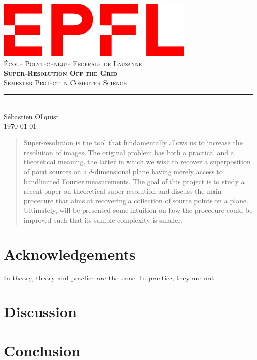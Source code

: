 \documentclass[11pt,titlepage]{report}
\begin{document}
\begin{titlepage}
	\centering
    \includegraphics[width=0.5\linewidth]{images/EPFL.png}\\[0.25cm] 	%
    \textsc{\LARGE École Polytechnique Fédérale de Lausanne}\\ \vspace{\fill}
    \textbf{\textsc{\fontsize{30}{30}\selectfont Super-Resolution Off the Grid}}\\ \vspace{\fill}		
	\textsc{\LARGE Semester Project in Computer Science}\\[0.4cm]
	\rule{\linewidth}{0.2 mm} \\[0.5 cm]
	Sébastien Ollquist \\[2cm] \today
\end{titlepage}
\restoregeometry

\thispagestyle{numberonly}
\begin{abstract}
    Super-resolution is the tool that fundamentally allows us to increase the resolution of images. The original problem has both a practical and a theoretical meaning, the latter in which we wish to recover a superposition of point sources on a $d$-dimensional plane having merely access to bandlimited Fourier measurements. The goal of this project is to study a recent paper on theoretical super-resolution and discuss the main procedure that aims at recovering a collection of source points on a plane. Ultimately, will be presented some intuition on how the procedure could be improved such that its sample complexity is smaller.
\end{abstract}
\chapter*{Acknowledgements}
\begin{fquote}
    In theory, theory and practice are the same. In practice, they are not.
\end{fquote} 
\newpage

\tableofcontents






\chapter{Discussion}

\chapter{Conclusion}

\printbibliography

\appendix


\clearpage
\pagestyle{numberonly}
\end{document}
